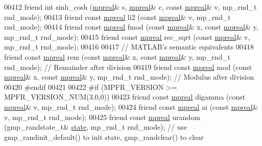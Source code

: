 \begin{DoxyCode}
00412     \textcolor{keyword}{friend} \textcolor{keywordtype}{int}          sinh\_cosh   (\hyperlink{classmpfr_1_1mpreal}{mpreal}& s, \hyperlink{classmpfr_1_1mpreal}{mpreal}& c, \textcolor{keyword}{const} 
      \hyperlink{classmpfr_1_1mpreal}{mpreal}& v, mp\_rnd\_t rnd\_mode);
00413     \textcolor{keyword}{friend} \textcolor{keyword}{const} \hyperlink{classmpfr_1_1mpreal}{mpreal} li2         (\textcolor{keyword}{const} \hyperlink{classmpfr_1_1mpreal}{mpreal}& v,                       mp\_rnd\_t rnd\_mode);
00414     \textcolor{keyword}{friend} \textcolor{keyword}{const} \hyperlink{classmpfr_1_1mpreal}{mpreal} fmod        (\textcolor{keyword}{const} \hyperlink{classmpfr_1_1mpreal}{mpreal}& x, \textcolor{keyword}{const} \hyperlink{classmpfr_1_1mpreal}{mpreal}& y,      mp\_rnd\_t 
      rnd\_mode);
00415     \textcolor{keyword}{friend} \textcolor{keyword}{const} \hyperlink{classmpfr_1_1mpreal}{mpreal} rec\_sqrt    (\textcolor{keyword}{const} \hyperlink{classmpfr_1_1mpreal}{mpreal}& v,                       mp\_rnd\_t rnd\_mode);
00416 
00417     \textcolor{comment}{// MATLAB's semantic equivalents}
00418     \textcolor{keyword}{friend} \textcolor{keyword}{const} \hyperlink{classmpfr_1_1mpreal}{mpreal} rem (\textcolor{keyword}{const} \hyperlink{classmpfr_1_1mpreal}{mpreal}& x, \textcolor{keyword}{const} \hyperlink{classmpfr_1_1mpreal}{mpreal}& y, mp\_rnd\_t rnd\_mode); \textcolor{comment}{//
       Remainder after division}
00419     \textcolor{keyword}{friend} \textcolor{keyword}{const} \hyperlink{classmpfr_1_1mpreal}{mpreal} mod (\textcolor{keyword}{const} \hyperlink{classmpfr_1_1mpreal}{mpreal}& x, \textcolor{keyword}{const} \hyperlink{classmpfr_1_1mpreal}{mpreal}& y, mp\_rnd\_t rnd\_mode); \textcolor{comment}{//
       Modulus after division}
00420 \textcolor{preprocessor}{#endif}
00421 
00422 \textcolor{preprocessor}{#if (MPFR\_VERSION >= MPFR\_VERSION\_NUM(3,0,0))}
00423     \textcolor{keyword}{friend} \textcolor{keyword}{const} \hyperlink{classmpfr_1_1mpreal}{mpreal} digamma (\textcolor{keyword}{const} \hyperlink{classmpfr_1_1mpreal}{mpreal}& v,        mp\_rnd\_t rnd\_mode);
00424     \textcolor{keyword}{friend} \textcolor{keyword}{const} \hyperlink{classmpfr_1_1mpreal}{mpreal} ai      (\textcolor{keyword}{const} \hyperlink{classmpfr_1_1mpreal}{mpreal}& v,        mp\_rnd\_t rnd\_mode);
00425     \textcolor{keyword}{friend} \textcolor{keyword}{const} \hyperlink{classmpfr_1_1mpreal}{mpreal} urandom (gmp\_randstate\_t& \hyperlink{structstate}{state}, mp\_rnd\_t rnd\_mode);     \textcolor{comment}{// use
       gmp\_randinit\_default() to init state, gmp\_randclear() to clear}

\end{DoxyCode}
